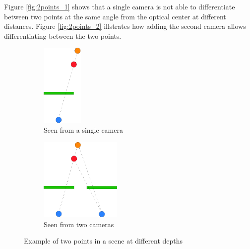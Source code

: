 Figure \vref{fig:2points_1} shows that a single camera is not able to differentiate between two points at the same angle from the optical center at different distances. Figure \vref{fig:2points_2} illstrates how adding the second camera allows differentiating between the two points.

\begin{figure}[ht]
  \centering
  \begin{subfigure}[t]{0.45\textwidth}
    \centering\includegraphics[height=4cm]{figures/2points_1}
    \caption{Seen from a single camera\label{fig:2points_1}}
  \end{subfigure}
  \begin{subfigure}[t]{0.45\textwidth}
    \centering\includegraphics[height=4cm]{figures/2points_2}
    \caption{Seen from two cameras\label{fig:2points_2}}
  \end{subfigure}
  \caption{Example of two points in a scene at different depths\label{fig:2points_all}}
\end{figure}

